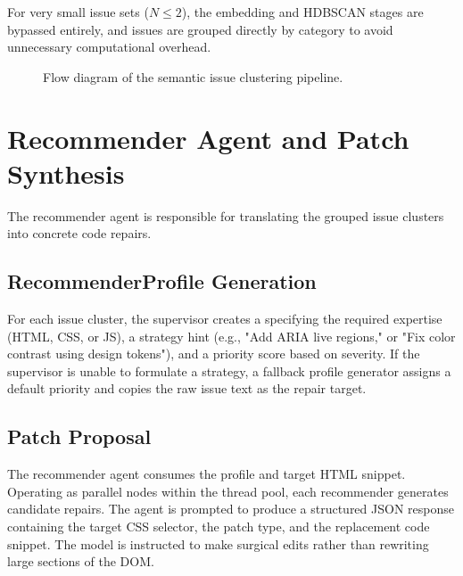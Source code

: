 For very small issue sets ($N \leq 2$), the embedding and HDBSCAN stages are bypassed entirely, and issues are grouped directly by category to avoid unnecessary computational overhead.

\begin{figure}[htbp]
  \centering
  \caption{Flow diagram of the semantic issue clustering pipeline.}
  \label{fig:clustering-pipeline}
\end{figure}


\section{Recommender Agent and Patch Synthesis}
\label{sec:recommender}

The recommender agent is responsible for translating the grouped issue clusters into concrete code repairs.

\subsection{RecommenderProfile Generation}
\label{sec:recommender-profiles}

For each issue cluster, the supervisor creates a  specifying the required expertise (HTML, CSS, or JS), a strategy hint (e.g., "Add ARIA live regions," or "Fix color contrast using design tokens"), and a priority score based on severity. If the supervisor is unable to formulate a strategy, a fallback profile generator assigns a default priority and copies the raw issue text as the repair target.

\subsection{Patch Proposal}
\label{sec:patch-proposal}

The recommender agent consumes the profile and target HTML snippet. Operating as parallel nodes within the thread pool, each recommender generates candidate repairs. The agent is prompted to produce a structured JSON response containing the target CSS selector, the patch type, and the replacement code snippet. The model is instructed to make surgical edits rather than rewriting large sections of the DOM.

